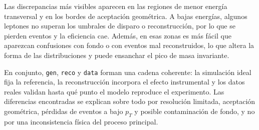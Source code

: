 \documentclass[11pt]{article}
\begin{document}
Las discrepancias más visibles aparecen en las regiones de menor energía
transversal y en los bordes de aceptación geométrica. A bajas energías,
algunos leptones no superan los umbrales de disparo o reconstrucción,
por lo que se pierden eventos y la eficiencia cae. Además, en esas zonas
es más fácil que aparezcan confusiones con fondo o con eventos mal
reconstruidos, lo que altera la forma de las distribuciones y puede
ensanchar el pico de masa invariante.

En conjunto, \texttt{gen}, \texttt{reco} y \texttt{data} forman una
cadena coherente: la simulación ideal fija la referencia, la
reconstrucción incorpora el efecto instrumental y los datos reales
validan hasta qué punto el modelo reproduce el experimento. Las
diferencias encontradas se explican sobre todo por resolución limitada,
aceptación geométrica, pérdidas de eventos a bajo \(p_T\) y posible
contaminación de fondo, y no por una inconsistencia física del proceso
principal.


    
    
    
\end{document}
